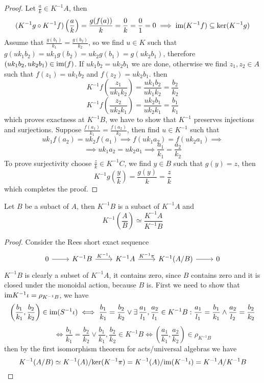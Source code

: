 \begin{proof}[Proof]
    Let $\frac{a}{k}\in K^{-1}A$, then 
    \[
    (K^{-1}g\circ K^{-1}f)\left(\frac{a}{k}\right) = \frac{g(f(a))}{k} = \frac{0}{k} =\frac{0}{1}=0 \implies \text{im}(K^{-1}f)\subseteq\mathrm{ker}(K^{-1}g)
    \]
    Assume that $\frac{g(b_1)}{k_1}=\frac{g(b_2)}{k_2}$, so we find $u\in K$ such that 
    $g(uk_1b_2)=uk_1g(b_2)=uk_2g(b_1)=g(uk_2b_1)$, therefore 
    $(uk_1b_2,uk_2b_1)\in\text{im}(f)$. If $uk_1b_2=uk_2b_1$ we are done, otherwise 
    we find $z_1,z_2\in A$ such that $f(z_1) = uk_1b_2$ and $f(z_2)=uk_2b_1$.
    then 
    \[
        K^{-1}f\left(\frac{z_1}{uk_1k_2}\right) = \frac{uk_1b_2}{uk_1k_2} = \frac{b_2}{k_2}
    \] 
    \[
        K^{-1}f\left(\frac{z_2}{uk_2k_1}\right) = \frac{uk_2b_1}{uk_2k_1} = \frac{b_1}{k_1}
    \]
    which proves exactness at $K^{-1}B$, we have to show that $K^{-1}$ preserves injections and surjections.
    Suppose $\frac{f(a_1)}{k_1}=\frac{f(a_2)}{k_2}$, then find $u\in K^{-1}$ such that 
    \[
        uk_1f(a_2) = uk_2f(a_1)\implies f(uk_1a_2)=f(uk_2a_1) \implies
    \] 
    \[
        \implies uk_1a_2=uk_2a_1 \implies\frac{a_1}{k_1}=\frac{a_2}{k_2}
    \]
    To prove surjectivity choose $\frac{z}{k}\in K^{-1}C$, we find $y\in B$ such that $g(y)=z$, then 
    \[
        K^{-1}g\left(\frac{y}{k}\right) = \frac{g(y)}{k} = \frac{z}{k}
    \]
    which completes the proof.
\end{proof}
\begin{corollary}
    Let $B$ be a subact of $A$, then $K^{-1}B$ is a subact of $K^{-1}A$ and  
    \[
        K^{-1}\left(\frac{A}{B}\right) \simeq \frac{K^{-1}A}{K^{-1}B}
    \]
\end{corollary}
\begin{proof}[Proof]
    Consider the Rees short exact sequence 
    \[\begin{tikzcd}
        0 & {K^{-1}B} & {K^{-1}A} & {K^{-1}(A/B)} & 0
        \arrow[from=1-1, to=1-2]
        \arrow["{K^{-1}\iota}", from=1-2, to=1-3]
        \arrow["{K^{-1}\pi}", from=1-3, to=1-4]
        \arrow[from=1-4, to=1-5]
    \end{tikzcd}\]
    $K^{-1}B$ is clearly a subset of $K^{-1}A$, it contains zero, since $B$ contains zero and 
    it is closed under the monoidal action, because $B$ is.
    First we need to show that $\text{im} K^{-1}\iota = \rho_{K^{-1}B}$, we have 
    \[
    \left(\frac{b_1}{k_1},\frac{b_2}{k_2}\right)\in\text{im}(S^{-1}\iota) \iff \frac{b_1}{k_1}=\frac{b_2}{k_2}\lor\exists\,\frac{a_1}{l_1},\frac{a_2}{l_1}\in K^{-1}B :
    \frac{a_1}{l_1}=\frac{b_1}{k_1}\land\frac{a_2}{l_2}=\frac{b_2}{k_2}
    \]
    \[
        \iff \frac{b_1}{k_1}=\frac{b_2}{k_2}\lor \frac{b_1}{k_1},\frac{b_2}{k_2}\in K^{-1}B \iff \left(\frac{a_1}{k_1},\frac{a_2}{k_2}\right)\in\rho_{K^{-1}B}
    \]
    then by the first isomorphism theorem for acts/universal algebras \cite[Theorem~4.21]{Kilp00} we have 
    \[
    K^{-1}(A/B)\simeq K^{-1}(A)/\mathrm{ker}(K^{-1}\pi) = K^{-1}(A)/\text{im}(K^{-1}\iota) = K^{-1}A/K^{-1}B
    \]
\end{proof}
